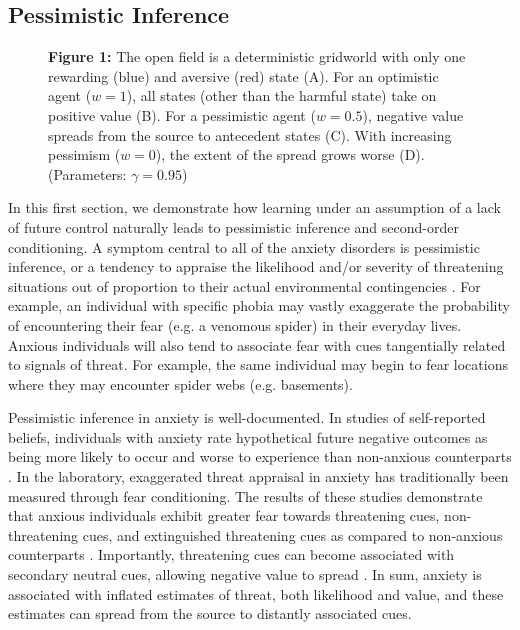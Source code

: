 \documentclass[11pt]{article} %
\begin{document}
\subsection{Pessimistic Inference}

\begin{figure}
  \centerline{%
  }
  \par \textbf{Figure 1:} The open field is a deterministic gridworld with only one rewarding (blue) and aversive (red) state (A). For an optimistic agent ($w=1$), all states (other than the harmful state) take on positive value (B). For a pessimistic agent ($w=0.5$), negative value spreads from the source to antecedent states (C). With increasing pessimism ($w=0$), the extent of the spread grows worse (D). (Parameters: $\gamma = 0.95$)
\end{figure}

In this first section, we demonstrate how learning under an assumption of a lack of future control naturally leads to pessimistic inference and second-order conditioning. A symptom central to all of the anxiety disorders is pessimistic inference, or a tendency to appraise the likelihood and/or severity of threatening situations out of proportion to their actual environmental contingencies \citep{dsm5, BeckClark1997, ClarkBeck2011}. For example, an individual with specific phobia may vastly exaggerate the probability of encountering their fear (e.g. a venomous spider) in their everyday lives. Anxious individuals will also tend to associate fear with cues tangentially related to signals of threat. For example, the same individual may begin to fear locations where they may encounter spider webs (e.g. basements).

Pessimistic inference in anxiety is well-documented. In studies of self-reported beliefs, individuals with anxiety rate hypothetical future negative outcomes as being more likely to occur and worse to experience than non-anxious counterparts \citep{ButlerMathews1983, ButlerMathews1987, Foa1996, MacLeod1996, MacLeod1997, Luten1997, Stober1997, Borkovec1999, Maner2006, Mitte2007, Miranda2007}. In the laboratory, exaggerated threat appraisal in anxiety has traditionally been measured through fear conditioning. The results of these studies demonstrate that anxious individuals exhibit greater fear towards threatening cues, non-threatening cues, and extinguished threatening cues as compared to non-anxious counterparts \citep{lissek2005, MinekaOehlberg2008, Duits2015}. Importantly, threatening cues can become associated with secondary neutral cues, allowing negative value to spread \citep{wessa2007}. In sum, anxiety is associated with inflated estimates of threat, both likelihood and value, and these estimates can spread from the source to distantly associated cues.
\end{document}
